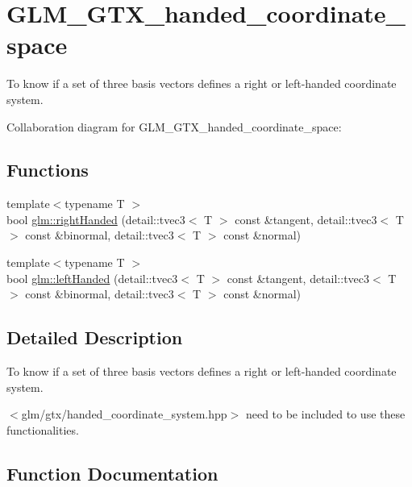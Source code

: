 \hypertarget{group__gtx__handed__coordinate__space}{}\section{G\+L\+M\+\_\+\+G\+T\+X\+\_\+handed\+\_\+coordinate\+\_\+space}
\label{group__gtx__handed__coordinate__space}


To know if a set of three basis vectors defines a right or left-\/handed coordinate system.  


Collaboration diagram for G\+L\+M\+\_\+\+G\+T\+X\+\_\+handed\+\_\+coordinate\+\_\+space\+:
\subsection*{Functions}
\begin{DoxyCompactItemize}
\item 
{\footnotesize template$<$typename T $>$ }\\bool \hyperlink{group__gtx__handed__coordinate__space_gabf06566f29bba31600e114ecbeef379a}{glm\+::right\+Handed} (detail\+::tvec3$<$ T $>$ const \&tangent, detail\+::tvec3$<$ T $>$ const \&binormal, detail\+::tvec3$<$ T $>$ const \&normal)
\item 
{\footnotesize template$<$typename T $>$ }\\bool \hyperlink{group__gtx__handed__coordinate__space_ga574a69fa0e592151454d3d2dd03275d9}{glm\+::left\+Handed} (detail\+::tvec3$<$ T $>$ const \&tangent, detail\+::tvec3$<$ T $>$ const \&binormal, detail\+::tvec3$<$ T $>$ const \&normal)
\end{DoxyCompactItemize}


\subsection{Detailed Description}
To know if a set of three basis vectors defines a right or left-\/handed coordinate system. 

$<$glm/gtx/handed\+\_\+coordinate\+\_\+system.\+hpp$>$ need to be included to use these functionalities. 

\subsection{Function Documentation}
\hypertarget{group__gtx__handed__coordinate__space_ga574a69fa0e592151454d3d2dd03275d9}{}
